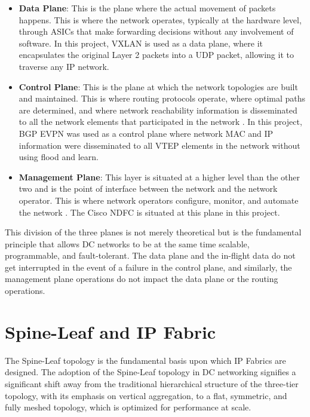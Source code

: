 \begin{itemize}
    \item \textbf{Data Plane}: This is the plane where the actual movement of packets happens. This is where the network operates, typically at the hardware level, through ASICs that make forwarding decisions without any involvement of software\cite{ASIC_Based_Forwarding_Architecture}. In this project, VXLAN is used as a data plane, where it encapsulates the original Layer 2 packets into a UDP packet, allowing it to traverse any IP network.
    \item \textbf{Control Plane}: This is the plane at which the network topologies are built and maintained. This is where routing protocols operate, where optimal paths are determined, and where network reachability information is disseminated to all the network elements that participated in the network \cite{IETFRFC4271}. In this project, BGP EVPN was used as a control plane where network MAC and IP information were disseminated to all VTEP elements in the network without using flood and learn.
    \item \textbf{Management Plane}: This layer is situated at a higher level than the other two and is the point of interface between the network and the network operator. This is where network operators configure, monitor, and automate the network \cite{NDFC_Product_Documentation}. The Cisco NDFC is situated at this plane in this project.
\end{itemize}
This division of the three planes is not merely theoretical but is the fundamental principle that allows DC networks to be at the same time scalable, programmable, and fault-tolerant. The data plane and the in-flight data do not get interrupted in the event of a failure in the control plane, and similarly, the management plane operations do not impact the data plane or the routing operations.

\section{Spine-Leaf and IP Fabric}
The Spine-Leaf topology is the fundamental basis upon which IP Fabrics are designed. The adoption of the Spine-Leaf topology in DC networking signifies a significant shift away from the traditional hierarchical structure of the three-tier topology, with its emphasis on vertical aggregation, to a flat, symmetric, and fully meshed topology, which is optimized for performance at scale.

